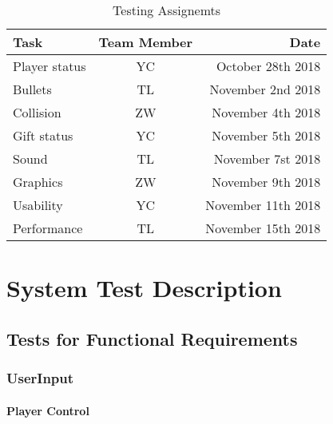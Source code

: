 \documentclass[12pt, titlepage]{article}
\begin{document}
	\begin{table}[!htbp]

	\begin{tabular}[pos]{|l|c|r|}
		
		\hline
		\textbf{Task}& \textbf{Team Member} & \textbf{Date} \\ \hline
		Player status& YC & October 28th 2018\\ \hline
		Bullets & TL & November 2nd 2018\\ \hline
		Collision & ZW & November 4th 2018
	\\ \hline
		Gift status & YC & November 5th 2018 \\ \hline
		Sound & TL & November 7st 2018 \\ \hline
		Graphics & ZW & November 9th 2018 \\ \hline
		Usability & YC & November 11th 2018 \\ \hline
		Performance & TL & November 15th 2018 \\ \hline 
		
	\end{tabular}
		\caption{Testing Assignemts}
		\label{Table 4}	
	
\end{table}	

\section{System Test Description}
	
\subsection{Tests for Functional Requirements}

\subsubsection{UserInput}
		
\paragraph{Player Control}
\end{document}
